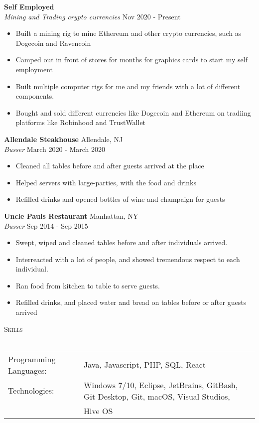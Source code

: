 \documentclass[a4paper]{article}
\newcommand{\lineunder} {
    \vspace*{-8pt} \\
    \hspace*{-18pt} \hrulefill \\
}
\newcommand{\header} [1] {
    {\hspace*{-18pt}\vspace*{6pt} \textsc{#1}}
    \vspace*{-6pt} \lineunder
}
\begin{document}
\textbf{Self Employed}\\
\textit{Mining and Trading crypto currencies} \hfill Nov 2020 - Present\\
\vspace{-1mm}
\begin{itemize} \itemsep 1pt
	\item Built a mining rig to mine Ethereum and other crypto currencies, such as Dogecoin and Ravencoin
	\item Camped out in front of stores for months for graphics cards to start my self employment
	\item Built multiple computer rigs for me and my friends with a lot of different components.
	\item Bought and sold different currencies like Dogecoin and Ethereum on tradiing platforms like Robinhood and TrustWallet
\end{itemize}
\textbf{Allendale Steakhouse} \hfill Allendale, NJ\\
\textit{Busser} \hfill March 2020 - March 2020\\
\vspace{-1mm}
\begin{itemize} \itemsep 1pt
	\item Cleaned all tables before and after guests arrived at the place
	\item Helped servers with large-parties, with the food and drinks
	\item Refilled drinks and opened bottles of wine and champaign for guests
\end{itemize}
\textbf{Uncle Paul\textquotesingle{}s Restaurant} \hfill Manhattan, NY\\
\textit{Busser} \hfill Sep 2014 - Sep 2015\\
\vspace{-1mm}
\begin{itemize} \itemsep 1pt
	\item Swept, wiped and cleaned tables before and after individuals arrived.
	\item Interreacted with a lot of people, and showed tremendous respect to each individual.
	\item Ran food from kitchen to table to serve guests.
	\item Refilled drinks, and placed water and bread on tables before or after guests arrived
\end{itemize}

\header{Skills}
\begin{tabular}{ l l }
	Programming Languages: & Java, Javascript, PHP, SQL, React                                                   \\
	Technologies:          & Windows 7/10, Eclipse, JetBrains, GitBash, Git Desktop, Git, macOS, Visual Studios, \\
				& Hive OS	\\
\end{tabular}
\vspace{2mm}
\end{document}
